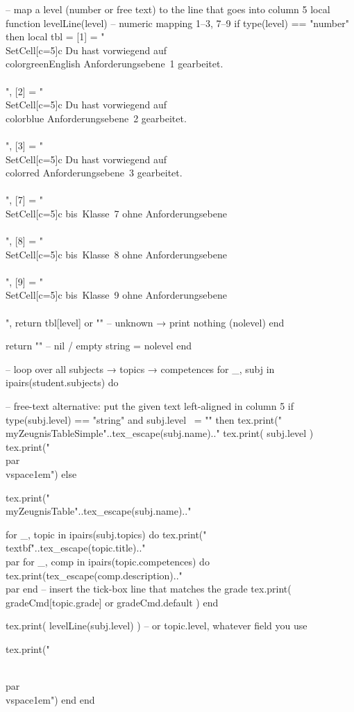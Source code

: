 \begin{luacode*}
	-- map a level (number or free text) to the line that goes into column 5
	local function levelLine(level)
	-- numeric mapping 1–3, 7–9
	if type(level) == "number" then
	local tbl = {
		[1] = "\\SetCell[c=5]{c} Du hast vorwiegend auf {\\color{greenEnglish} Anforderungsebene~1} gearbeitet.\\\\",
		[2] = "\\SetCell[c=5]{c} Du hast vorwiegend auf {\\color{blue} Anforderungsebene~2} gearbeitet.\\\\",
		[3] = "\\SetCell[c=5]{c} Du hast vorwiegend auf {\\color{red} Anforderungsebene~3} gearbeitet.\\\\",
		[7] = "\\SetCell[c=5]{c} bis~Klasse~7 ohne Anforderungsebene\\\\",
		[8] = "\\SetCell[c=5]{c} bis~Klasse~8 ohne Anforderungsebene\\\\",
		[9] = "\\SetCell[c=5]{c} bis~Klasse~9 ohne Anforderungsebene\\\\",
	}
	return tbl[level] or ""          -- unknown → print nothing (nolevel)
	end
	
	return ""                          -- nil / empty string  =  nolevel
	end
	
	
	-- loop over all subjects → topics → competences
	for _, subj in ipairs(student.subjects) do
	
	
	-- free-text alternative: put the given text left-aligned in column 5
	if type(subj.level) == "string" and subj.level ~= "" then
	tex.print("\\myZeugnisTableSimple{"..tex_escape(subj.name).."}{%
		tex.print( subj.level )
		tex.print("}\\par\\vspace{1em}")
	else
	
	tex.print("\\myZeugnisTable{"..tex_escape(subj.name).."}{%
		
		for _, topic in ipairs(subj.topics) do
		tex.print("\\textbf{"..tex_escape(topic.title).."}\\par%
		for _, comp in ipairs(topic.competences) do
		tex.print(tex_escape(comp.description).."\\par%
		end
		-- insert the tick-box line that matches the grade
		tex.print( gradeCmd[topic.grade] or gradeCmd.default )
		end
		
		tex.print( levelLine(subj.level) )   -- or topic.level, whatever field you use
		
		tex.print("}\\par\\vspace{1em}")
	end
	end
\end{luacode*}
